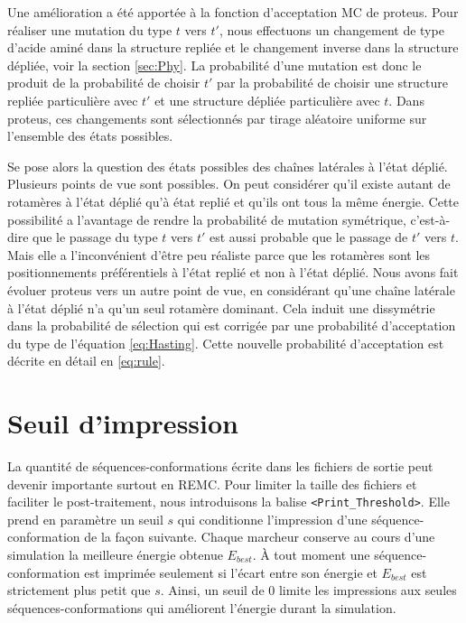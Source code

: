 Une amélioration a été apportée à la fonction d'acceptation MC de proteus. Pour réaliser une mutation du type $t$ vers $t'$, nous effectuons un changement de type d'acide aminé dans la structure repliée et le changement inverse dans la structure dépliée, voir la section \ref{sec:Phy}. La probabilité d'une mutation est donc le produit de la probabilité de choisir $t'$ par la probabilité de choisir une structure repliée particulière avec $t'$ et une structure dépliée particulière avec $t$. Dans proteus, ces changements sont sélectionnés par tirage aléatoire uniforme sur l'ensemble des états possibles. 

Se pose alors la question des états possibles des chaînes latérales à l'état déplié. Plusieurs points de vue sont possibles. On peut considérer qu'il existe autant de rotamères à l'état déplié qu'à état replié et qu'ils ont tous la même énergie. Cette possibilité a l'avantage de rendre la probabilité de mutation symétrique, c'est-à-dire que le passage du type $t$ vers $t'$ est aussi probable que le passage de $t'$ vers $t$. Mais elle a l'inconvénient d'être peu réaliste parce que les rotamères sont les positionnements préférentiels à l'état replié et non à l'état déplié. Nous avons fait évoluer proteus vers un autre point de vue, en considérant qu'une chaîne latérale à l'état déplié n'a qu'un seul rotamère dominant. Cela induit une dissymétrie dans la probabilité de sélection qui est corrigée par une probabilité d'acceptation du type de l'équation \ref{eq:Hasting}. Cette nouvelle probabilité d'acceptation est décrite en détail en \vref{eq:rule}.

\section{Seuil d'impression}
\label{sec:dev}
La quantité de séquences-conformations écrite dans les fichiers de sortie peut devenir importante surtout en REMC. Pour limiter la taille des fichiers et faciliter le post-traitement, nous introduisons la balise \verb!<Print_Threshold>!. Elle prend en paramètre un seuil $s$ qui conditionne l'impression d'une séquence-conformation de la façon suivante. Chaque marcheur conserve au cours d'une simulation la meilleure énergie obtenue $E_{best}$. À tout moment une séquence-conformation est imprimée seulement si l'écart entre son énergie et $E_{best}$  est strictement plus petit que $s$. Ainsi, un seuil de $0$ limite les impressions aux seules séquences-conformations qui améliorent l'énergie durant la simulation.

